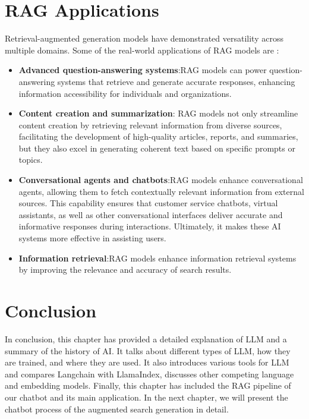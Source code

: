 \section{RAG Applications}
Retrieval-augmented generation models have demonstrated versatility across multiple domains. Some of the real-world applications of RAG models are :
\vskip 0.5cm
\begin{itemize}
    \item  \textbf{Advanced question-answering systems}:RAG models can power question-answering systems that retrieve and generate accurate responses, enhancing information accessibility for individuals and organizations. 
    \item \textbf{Content creation and summarization}: RAG models not only streamline content creation by retrieving relevant information from diverse sources, facilitating the development of high-quality articles, reports, and summaries, but they also excel in generating coherent text based on specific prompts or topics.
    \item \textbf{Conversational agents and chatbots}:RAG models enhance conversational agents, allowing them to fetch contextually relevant information from external sources. This capability ensures that customer service chatbots, virtual assistants, as well as other conversational interfaces deliver accurate and informative responses during interactions. Ultimately, it makes these AI systems more effective in assisting users.
    \item \textbf{Information retrieval}:RAG models enhance information retrieval systems by improving the relevance and accuracy of search results.
\end{itemize}

\section{Conclusion}
In conclusion, this chapter has provided a detailed explanation of LLM and a summary of the history of AI. It talks about different types of LLM, how they are trained, and where they are used. It also introduces various tools for LLM and compares Langchain with LlamaIndex, discusses other competing language and embedding models. Finally, this chapter has included the RAG pipeline of our chatbot and its main application.
\vskip 0.5cm
In the next chapter, we will present the chatbot process of the augmented search generation in detail.



